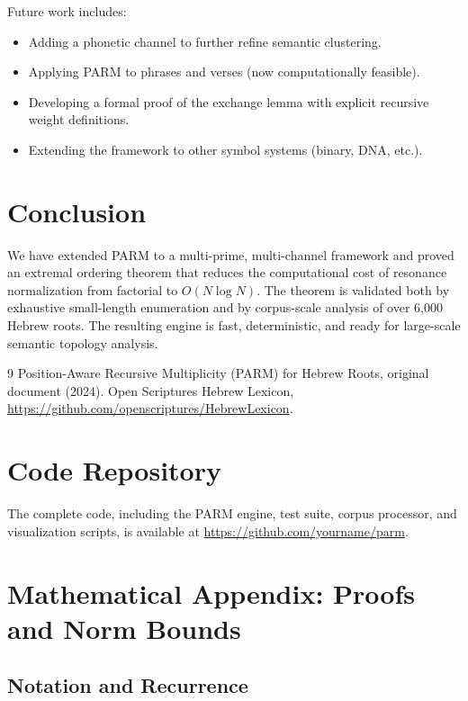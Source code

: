 \documentclass[12pt]{article}
\theoremstyle{plain}
\theoremstyle{definition}
\theoremstyle{remark}
\begin{document}
Future work includes:

\begin{itemize}
\item Adding a phonetic channel to further refine semantic clustering.
\item Applying PARM to phrases and verses (now computationally feasible).
\item Developing a formal proof of the exchange lemma with explicit recursive weight definitions.
\item Extending the framework to other symbol systems (binary, DNA, etc.).
\end{itemize}

\section{Conclusion}

We have extended PARM to a multi-prime, multi-channel framework and proved an extremal ordering theorem that reduces the computational cost of resonance normalization from factorial to $O(N \log N)$. The theorem is validated both by exhaustive small-length enumeration and by corpus-scale analysis of over 6,000 Hebrew roots. The resulting engine is fast, deterministic, and ready for large-scale semantic topology analysis.


\begin{thebibliography}{9}
 Position-Aware Recursive Multiplicity (PARM) for Hebrew Roots, original document (2024).
 Open Scriptures Hebrew Lexicon, \url{https://github.com/openscriptures/HebrewLexicon}.
\end{thebibliography}

\appendix
\section{Code Repository}
The complete code, including the PARM engine, test suite, corpus processor, and visualization scripts, is available at \url{https://github.com/yourname/parm}.

\appendix
\section{Mathematical Appendix: Proofs and Norm Bounds}

\subsection{Notation and Recurrence}
\end{document}
